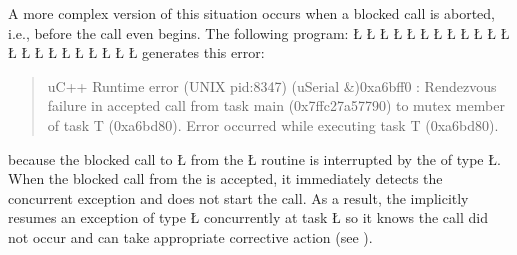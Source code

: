 \documentclass[openright,twoside]{report}
\begin{document}
A more complex version of this situation occurs when a blocked call is aborted, i.e., before the call even begins.
The following program:
\LGinlinefalse\LGbegin\lgrinde
\L{}
\L{\LB{}}
\L{}
\L{\LB{}}
\L{}
\L{\LB{}}
\L{\LB{}}
\L{}
\L{\LB{}}
\L{\LB{}}
\L{\LB{}}
\L{\LB{}}
\L{\LB{\};}}
\endlgrinde\LGend
\LGinlinefalse\LGbegin\lgrinde
\L{}
\L{\LB{}}
\L{\LB{}}
\L{\LB{}}
\L{\LB{}}
\L{\LB{}}
\L{\LB{}}
\L{\LB{}}
\L{\LB{\}}}
\endlgrinde\LGend
generates this error:
\begin{quote}
\BGfont
uC++ Runtime error (UNIX pid:8347) (uSerial \&)0xa6bff0 : Rendezvous failure in accepted call from task main (0x7ffc27a57790) to mutex member of task T (0xa6bd80).
Error occurred while executing task T (0xa6bd80).
\end{quote}
because the blocked call to \LGinlinetrue\LGbegin\lgrinde\L{}\endlgrinde\LGend{} from the \LGinlinetrue\LGbegin\lgrinde\L{}\endlgrinde\LGend{} routine is interrupted by the  of type \LGinlinetrue\LGbegin\lgrinde\L{}\endlgrinde\LGend{}.
When the blocked call from the  is accepted, it immediately detects the concurrent exception and does not start the call.
As a result, the  implicitly resumes an exception of type \LGinlinetrue\LGbegin\lgrinde\L{}\endlgrinde\LGend{} concurrently at task \LGinlinetrue\LGbegin\lgrinde\L{}\endlgrinde\LGend{} so it knows the call did not occur and can take appropriate corrective action (see ).
\end{document}
